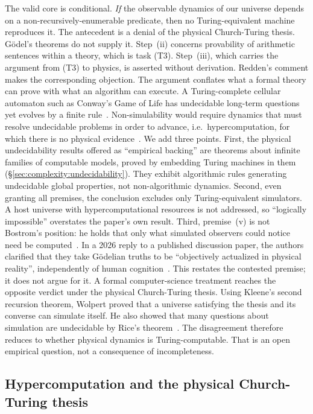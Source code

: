 The valid core is conditional. \emph{If} the observable dynamics of our
universe depends on a non-recursively-enumerable predicate, then no
Turing-equivalent machine reproduces it. The antecedent is a denial of the
physical Church-Turing thesis. Gödel's theorems do not supply it. Step~(ii)
concerns provability of arithmetic sentences within a theory, which is task
(T3). Step~(iii), which carries the argument from (T3) to physics, is asserted
without derivation. Redden's comment makes the corresponding objection. The
argument conflates what a formal theory can prove with what an algorithm can
execute. A Turing-complete cellular automaton such as Conway's Game of Life
has undecidable long-term questions yet evolves by a finite
rule~\cite{Redden2025provability}. Non-simulability would require dynamics
that must resolve undecidable problems in order to advance, i.e.\
hypercomputation, for which there is no physical evidence~\cite{Redden2025provability}.
We add three points. First, the physical undecidability results offered as
``empirical backing'' are theorems about infinite families of computable
models, proved by embedding Turing machines in them
(\S\ref{sec:complexity:undecidability}). They exhibit algorithmic rules
generating undecidable global properties, not non-algorithmic dynamics.
Second, even granting all premises, the conclusion excludes only
Turing-equivalent simulators. A host universe with hypercomputational
resources is not addressed, so ``logically impossible'' overstates the paper's
own result. Third, premise~(v) is not Bostrom's position: he holds that only
what simulated observers could notice need be computed~\cite{Bostrom2003are}.
In a 2026 reply to a published discussion paper, the authors clarified that
they take Gödelian truths to be ``objectively actualized in physical
reality'', independently of human cognition~\cite{Faizal2026reply}. This
restates the contested premise; it does not argue for it. A formal
computer-science treatment reaches the opposite verdict under the physical
Church-Turing thesis. Using Kleene's second recursion theorem, Wolpert proved
that a universe satisfying the thesis and its converse can simulate itself.
He also showed that many questions about simulation are undecidable by Rice's
theorem~\cite{Wolpert2025what}. The disagreement therefore reduces to whether
physical dynamics is Turing-computable. That is an open empirical question,
not a consequence of incompleteness.

\subsection{Hypercomputation and the physical Church-Turing thesis}
\label{sec:complexity:hypercomputation}

